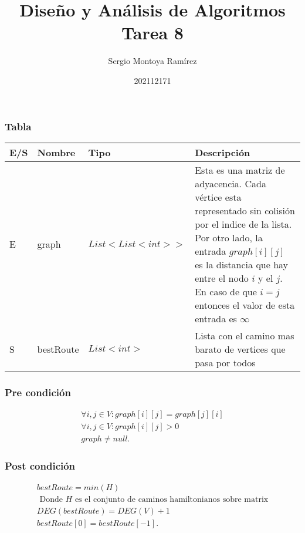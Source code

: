 \documentclass{report}
\title{\Huge{Diseño y Análisis de Algoritmos}\\Tarea 8}
\author{\huge{Sergio Montoya Ramírez}}
\date{202112171}
\begin{document}
\maketitle
\newpage%
\tableofcontents
\pagebreak

\chapter{}

\section{}

\subsection{Tabla}

\noindent \begin{tabularx}{\textwidth}{@{} l X X X @{}}
\toprule
\textbf{E/S} & \textbf{Nombre} & \textbf{Tipo} & \textbf{Descripción} \\
\midrule
E
& graph
& $List<List<int>>$
& Esta es una matriz de adyacencia. Cada vértice esta representado sin colisión por el indice de la lista. Por otro lado, la entrada $graph[i][j]$ es la distancia que hay entre el nodo $i$ y el $j$. En caso de que $i = j$ entonces el valor de esta entrada es  $\infty$ \\
S
& bestRoute
& $List<int>$
& Lista con el camino mas barato de vertices que pasa por todos\\
\bottomrule
\end{tabularx}

\subsection{Pre condición}
\begin{align*}
  \forall i, j \in V: graph[i][j] = graph[j][i]\\
  \forall i, j \in V: graph[i][j] >  0\\
  graph \neq null
.\end{align*}

\subsection{Post condición}

\begin{align*}
  bestRoute = min(H)\\ \text{ Donde }H\text{ es el conjunto de caminos hamiltonianos sobre matrix}\\
  DEG(bestRoute) = DEG(V) + 1\\
  bestRoute[0] = bestRoute[-1]
.\end{align*}
\end{document}
